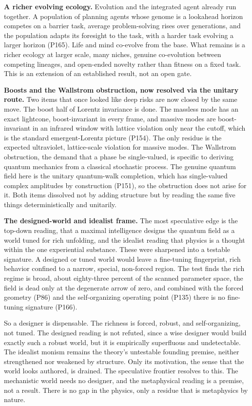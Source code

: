 \textbf{A richer evolving ecology.} Evolution and the integrated agent already run together. A population of
planning agents whose genome is a lookahead horizon competes on a barrier task, average problem-solving rises
over generations, and the population adapts its foresight to the task, with a harder task evolving a larger
horizon (P165). Life and mind co-evolve from the base. What remains is a richer ecology at larger scale, many
niches, genuine co-evolution between competing lineages, and open-ended novelty rather than fitness on a fixed
task. This is an extension of an established result, not an open gate.

\textbf{Boosts and the Wallstrom obstruction, now resolved via the unitary route.} Two items that once looked
like deep risks are now closed by the same move. The boost half of Lorentz invariance is done. The massless
mode has an exact lightcone, boost-invariant in every frame, and massive modes are boost-invariant in an
infrared window with lattice violation only near the cutoff, which is the standard emergent-Lorentz picture
(P154). The only residue is the expected ultraviolet, lattice-scale violation for massive modes. The
Wallstrom obstruction, the demand that a phase be single-valued, is specific to deriving quantum mechanics
from a classical stochastic process. The genuine quantum field here is the unitary quantum-walk completion,
which has single-valued complex amplitudes by construction (P151), so the obstruction does not arise for it.
Both items dissolved not by adding structure but by reading the same five things deterministically and
unitarily.

\textbf{The designed-world and idealist frame.} The most speculative edge is the top-down reading, that a
maximal intelligence designs the quantum field as a world tuned for rich unfolding, and the idealist reading
that physics is a thought within the one experiential substance. These were sharpened into a testable
signature. A designed or tuned world would leave a fine-tuning fingerprint, rich behavior confined to a
narrow, special, non-forced region. The test finds the rich regime is broad, about eighty-three percent of
the scanned parameter space, the field is dead only at the degenerate arrow of zero, and combined with the
forced geometry (P86) and the self-organizing operating point (P135) there is no fine-tuning signature (P166).

So a designer is dispensable. The richness is forced, robust, and self-organizing, not tuned. The designed
reading is not refuted, since a wise designer would build exactly such a robust world, but it is empirically
superfluous and undetectable. The idealist monism remains the theory's untestable founding premise, neither
strengthened nor weakened by structure. Only its motivation, the sense that the world looks authored, is
drained. The speculative frontier resolves to this. The mechanistic world needs no designer, and the
metaphysical reading is a premise, not a result. There is no gap in the physics, only a residue that is
metaphysics by nature.

